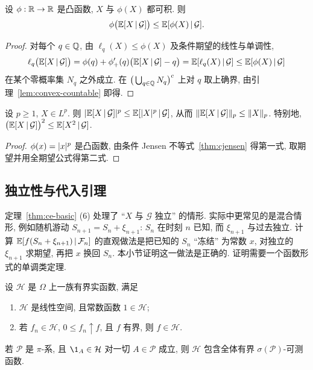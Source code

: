 \begin{theorem}\label{thm:cjensen}
设 $\phi:\mathbb{R}\to\mathbb{R}$ 是凸函数, $X$ 与 $\phi(X)$ 都可积. 则
\[
\phi\big(\mathbb{E}[X\,|\,\mathcal{G}]\big)\le\mathbb{E}[\phi(X)\,|\,\mathcal{G}].
\]
\end{theorem}

\begin{proof}
对每个 $q\in\mathbb{Q}$, 由 $\ell_q(X)\le\phi(X)$ 及条件期望的线性与单调性,
\[
\ell_q\big(\mathbb{E}[X\,|\,\mathcal{G}]\big)=\phi(q)+\phi'_+(q)\big(\mathbb{E}[X\,|\,\mathcal{G}]-q\big)=\mathbb{E}[\ell_q(X)\,|\,\mathcal{G}]\le\mathbb{E}[\phi(X)\,|\,\mathcal{G}]
\]
在某个零概率集 $N_q$ 之外成立. 在 $\big(\bigcup_{q\in\mathbb{Q}}N_q\big)^c$ 上对 $q$ 取上确界, 由引理~\ref{lem:convex-countable} 即得.
\end{proof}

\begin{corollary}[$L^p$ 压缩性]\label{cor:ce-Lp}
设 $p\ge1$, $X\in L^p$. 则 $\lvert\mathbb{E}[X\,|\,\mathcal{G}]\rvert^p\le\mathbb{E}[\lvert X\rvert^p\,|\,\mathcal{G}]$, 从而 $\lVert\mathbb{E}[X\,|\,\mathcal{G}]\rVert_p\le\lVert X\rVert_p$. 特别地, $\big(\mathbb{E}[X\,|\,\mathcal{G}]\big)^2\le\mathbb{E}[X^2\,|\,\mathcal{G}]$.
\end{corollary}

\begin{proof}
$\phi(x)=\lvert x\rvert^p$ 是凸函数, 由条件 Jensen 不等式~\ref{thm:cjensen} 得第一式, 取期望并用全期望公式得第二式.
\end{proof}

\subsection{独立性与代入引理}

定理~\ref{thm:ce-basic} (6) 处理了 ``$X$ 与 $\mathcal{G}$ 独立'' 的情形. 实际中更常见的是混合情形, 例如随机游动 $S_{n+1}=S_n+\xi_{n+1}$: $S_n$ 在时刻 $n$ 已知, 而 $\xi_{n+1}$ 与过去独立. 计算 $\mathbb{E}[f(S_n+\xi_{n+1})\,|\,\mathcal{F}_n]$ 的直观做法是把已知的 $S_n$ ``冻结'' 为常数 $x$, 对独立的 $\xi_{n+1}$ 求期望, 再把 $x$ 换回 $S_n$. 本小节证明这一做法是正确的. 证明需要一个函数形式的单调类定理.

\begin{theorem}[函数形式的单调类定理]\label{thm:functional-mct}
设 $\mathcal{H}$ 是 $\Omega$ 上一族有界实函数, 满足
\begin{enumerate}
\item $\mathcal{H}$ 是线性空间, 且常数函数 $1\in\mathcal{H}$;
\item 若 $f_n\in\mathcal{H}$, $0\le f_n\uparrow f$, 且 $f$ 有界, 则 $f\in\mathcal{H}$.
\end{enumerate}
若 $\mathcal{P}$ 是 $\pi$-系, 且 $\1_A\in\mathcal{H}$ 对一切 $A\in\mathcal{P}$ 成立, 则 $\mathcal{H}$ 包含全体有界 $\sigma(\mathcal{P})$-可测函数.
\end{theorem}

